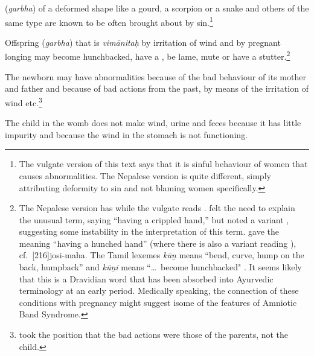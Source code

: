 \begin{translation}
\item [50]

 (\emph{garbha}) of a deformed 
shape like a gourd, a scorpion or a snake and 
others of the same type are known to be often brought about by 
sin.\footnote{The vulgate version of this text says that it is sinful behaviour of 
women that causes abnormalities.  The Nepalese version is quite different, 
simply attributing deformity to sin and not blaming women specifically.}

\item [51]

	Offspring (\emph{garbha}) that is \emph{vimānitaḥ} by irritation
of wind and by pregnant longing may become hunchbacked, have a
, be lame, mute or have a
stutter.\footnote{The Nepalese version has  while the
    vulgate reads .  felt the need to
    explain the unusual term, saying  “having a
    crippled hand,” but \citet[footnote 5]{acar-1939} noted a variant
    , suggesting some instability in the interpretation
    of this term.  gave the meaning 
    “having a hunched hand” (where there is also a variant reading
    ), cf.\ [216]{josi-maha}.   The Tamil
    lexemes\emph{ kū\b n} means “bend, curve, hump on the back, humpback”
    and \emph{kū\b ni} means “\ldots\ become hunchbacked"
    \citep[\#1927]{DED}. It seems likely that this is a Dravidian word
    that has been absorbed into Ayurvedic terminology at an early
    period. Medically speaking, the connection of these conditions
    with pregnancy might suggest isome of the features of 
    Amniotic Band Syndrome.}
    
\item[52]

The newborn may have abnormalities because of the bad behaviour of
its mother and father and because of bad actions from the past,
by means of the irritation of wind etc.\footnote{
    took the position that the bad actions were those of the parents, not
    the child.}

\item[53]

The child in the womb does not make wind, urine and feces because it has little 
impurity and because the wind in the stomach is not functioning.

\item[54] 


\end{translation}
